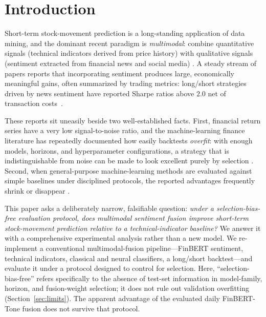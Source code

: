 \documentclass[conference]{IEEEtran}
\begin{document}
\section{Introduction}

Short-term stock-movement prediction is a long-standing application of data
mining, and the dominant recent paradigm is \emph{multimodal}: combine
quantitative signals (technical indicators derived from price history) with
qualitative signals (sentiment extracted from financial news and social media)
\cite{xu2018,sawhney2020,karadas2025,wang2023learning}. A steady stream of
papers reports that incorporating sentiment produces large, economically
meaningful gains, often summarized by trading metrics: long/short strategies
driven by news sentiment have reported Sharpe ratios above $2.0$ net of
transaction costs~\cite{kirtac2024}.

These reports sit uneasily beside two well-established facts. First, financial
return series have a very low signal-to-noise ratio, and the machine-learning
finance literature has repeatedly documented how easily backtests
\emph{overfit}: with enough models, horizons, and hyperparameter
configurations, a strategy that is indistinguishable from noise can be made to
look excellent purely by selection \cite{bailey2014dsr,bailey2016pbo,prado2018,
arnott2019,harvey2016}. Second, when general-purpose machine-learning methods
are evaluated against simple baselines under disciplined protocols, the
reported advantages frequently shrink or disappear \cite{makridakis2018}.

This paper asks a deliberately narrow, falsifiable question: \emph{under a
selection-bias-free evaluation protocol, does multimodal sentiment fusion
improve short-term stock-movement prediction relative to a technical-indicator
baseline?} We answer it with a comprehensive experimental analysis rather than
a new model. We re-implement a conventional multimodal-fusion pipeline---FinBERT
sentiment, technical indicators, classical and neural classifiers, a long/short
backtest---and evaluate it under a protocol designed to control for selection.
Here, ``selection-bias-free'' refers specifically to the absence of test-set
information in model-family, horizon, and fusion-weight selection; it does not
rule out validation overfitting (Section~\ref{sec:limits}).
The apparent advantage of the evaluated daily FinBERT-Tone fusion does not
survive that protocol.
\end{document}
